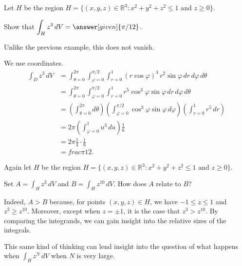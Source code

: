 \documentclass{ximera}
\begin{document}
\begin{example}
  Let $H$ be the region $H = \{ (x,y,z) \in \mathbb{R}^3 : x^2 + y^2 + z^2 \leq 1 \mbox{ and } z \geq 0 \}$.

  Show that $\displaystyle\int_H z^3 \, dV = \answer[given]{\pi/12}$.

  \begin{explanation}
    Unlike the previous example, this does not vanish.

    We use  coordinates.
    \begin{align*}
      \int_D z^3 \, dV
      &= \int_{\theta=0}^{2\pi} \int_{\varphi=0}^{\pi/2} \int_{r = 0}^1 (r \cos \varphi)^3 \, r^2 \sin \varphi \, dr \, d\varphi \, d\theta \\
      &= \int_{\theta=0}^{2\pi} \int_{\varphi=0}^{\pi/2} \int_{r = 0}^1 r^5 \cos^3 \varphi \sin \varphi \, dr \, d\varphi \, d\theta \\
      &= \left( \int_{\theta=0}^{2\pi} d\theta \right) \left(\int_{\varphi=0}^{\pi/2} \cos^3 \varphi \sin \varphi \, d\varphi \right) \left( \int_{r = 0}^1 r^5 \, dr \right) \\
      &= 2 \pi \left(\int_{\varphi=0}^{1} u^3 \, du \right) \frac{1}{6} \\
      &= 2 \pi \frac{1}{4} \cdot \frac{1}{6} \\
      &= frac{\pi}{12}.
    \end{align*}
  \end{explanation}
\end{example}

\begin{question}
  Again let $H$ be the region $H = \{ (x,y,z) \in \mathbb{R}^3 : x^2 + y^2 + z^2 \leq 1 \mbox{ and } z \geq 0 \}$.

  Set $A = \displaystyle\int_H z^3 \, dV$ and $B = \displaystyle\int_H z^{10} \, dV$.  How does $A$ relate to $B$?

  \begin{multipleChoice}
  \end{multipleChoice}

  \begin{feedback}[correct]
    Indeed, $A > B$ because, for points $(x,y,z) \in H$, we have
    $-1 \leq z \leq 1$ and $z^3 \geq z^{10}$.  Moreover, except when
    $z = \pm 1$, it is the case that $z^3 > z^{10}$.  By comparing the
    integrands, we can gain insight into the relative sizes of the
    integrals.

    This same kind of thinking can lend insight into the question of
    what happens when $\displaystyle\int_H z^N \, dV$ when $N$ is very
    large.
  \end{feedback}
\end{question}
\end{document}
